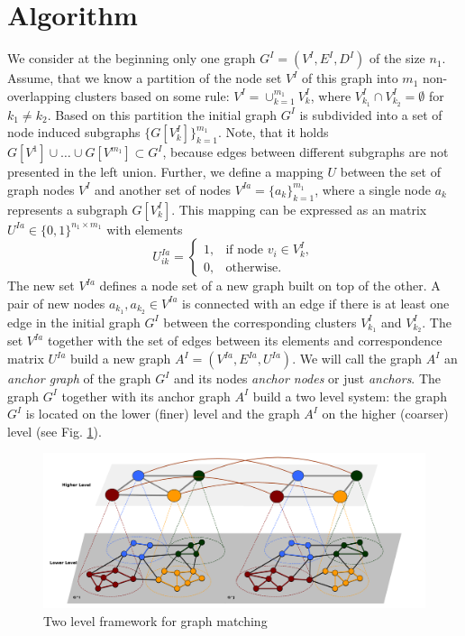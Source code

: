 \section{Algorithm}
We consider at the beginning only one graph $G^I=(V^I,E^I,D^I)$ of the size $n_1$. Assume, that we know a partition of the node set $V^I$ of this graph into $m_1$ non-overlapping clusters based on some rule: $V^I=\cup_{k=1}^{m_1}V^I_k$, where $V^I_{k_1}\cap V^I_{k_2}=\emptyset$ for $k_1\not=k_2$. Based on this partition the initial graph $G^I$ is subdivided into a set of node induced subgraphs $\{G[V^I_k]\}_{k=1}^{m_1}$. Note, that it holds $G[V^1]\cup\dots\cup G[V^{m_1}]\subset G^I$, because edges between different subgraphs are not presented in the left union.
Further, we define a mapping $U$ between the set of graph nodes $V^I$ and another set of nodes $V^{Ia}=\{a_k\}_{k=1}^{m_1}$, where a single node $a_k$ represents a subgraph  $G[V^I_k]$. This mapping can be expressed as an matrix $U^{Ia}\in\{0,1\}^{n_1\times m_1}$ with elements 
\begin{equation}\label{eq:matrixU}
U^{Ia}_{ik} = \begin{cases} 1, & \mbox{if node } v_i\in V^I_k,    \\
0, & \mbox{otherwise}.\end{cases}
\end{equation}
The new set $V^{Ia}$ defines a node set of a new graph built on top of the other. A pair of new nodes $a_{k_1},a_{k_2}\in V^{Ia}$ is connected with an edge if  there is at least one edge in the initial graph $G^I$ between the corresponding clusters $V^I_{k_1}$ and $V^I_{k_2}$. The set $V^{Ia}$ together with the set of edges between its elements and correspondence matrix $U^{Ia}$ build a new graph $A^I=(V^{Ia},E^{Ia},U^{Ia})$. We will call the graph $A^I$ an \emph{anchor graph} of the graph $G^I$ and its nodes \emph{anchor nodes} or just \emph{anchors}. The graph $G^I$ together with its anchor graph $A^I$ build a two level system: the graph $G^I$ is located on the lower (finer) level and the graph $A^I$ on the higher (coarser) level (see Fig. \ref{fig:2levels}).

\begin{figure} [h!]
	\centering
	\includegraphics[scale=0.35]{chapter2/fig/twolevels3.pdf}
	\caption{Two level framework for graph matching} \label{fig:2levels}
\end{figure}

